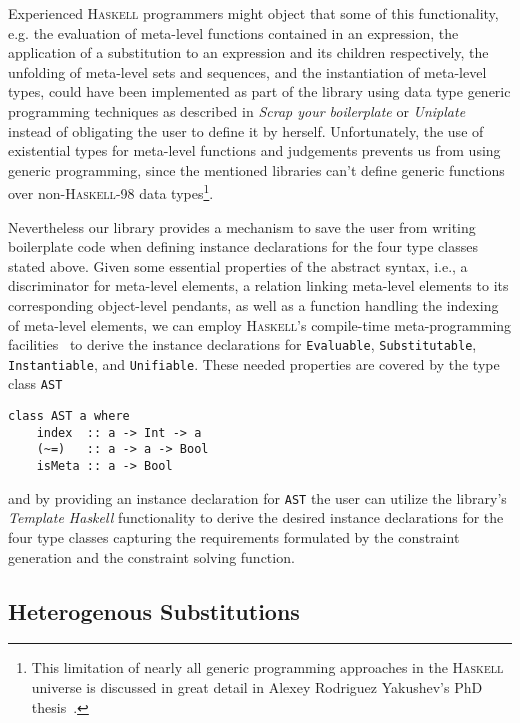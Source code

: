 Experienced \textsc{Haskell} programmers might object that some of
this functionality, e.g. the evaluation of meta-level functions
contained in an expression, the application of a substitution to an
expression and its children respectively, the unfolding of meta-level
sets and sequences, and the instantiation of meta-level types, could
have been implemented as part of the library using data type generic
programming techniques as described in \textit{Scrap your boilerplate}
\cite{Lammel2003} or \textit{Uniplate}~\cite{Mitchell2007} instead of
obligating the user to define it by herself. Unfortunately, the use of
existential types for meta-level functions and judgements prevents us
from using generic programming, since the mentioned libraries can't
define generic functions over non-\textsc{Haskell}-98 data
types\footnote{This limitation of nearly all generic programming
  approaches in the \textsc{Haskell} universe is discussed in great
  detail in Alexey Rodriguez Yakushev's PhD
  thesis~\cite{RodriguezYakushev2009}.}.

Nevertheless our library provides a mechanism to save the user from
writing boilerplate code when defining instance declarations for the
four type classes stated above. Given some essential properties of the
abstract syntax, i.e., a discriminator for meta-level elements, a
relation linking meta-level elements to its corresponding object-level
pendants, as well as a function handling the indexing of meta-level
elements, we can employ \textsc{Haskell}'s compile-time
meta-pro\-gramming facilities~\cite{SheardPeytonJones02} to derive the
instance declarations for \texttt{Evaluable}, \texttt{Substitutable},
\texttt{Instantiable}, and \texttt{Unifiable}.
These needed properties are covered by the type class \texttt{AST}
\begin{lstlisting}
class AST a where
    index  :: a -> Int -> a
    (~=)   :: a -> a -> Bool
    isMeta :: a -> Bool
\end{lstlisting}
and by providing an instance declaration for \texttt{AST} the user can
utilize the library's \textit{Template Haskell} functionality to
derive the desired instance declarations for the four type classes
capturing the requirements formulated by the constraint generation and
the constraint solving function.

\subsection{Heterogenous Substitutions}

